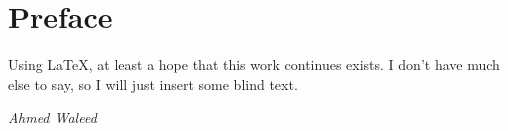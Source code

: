 \chapter*{Preface}

Using \LaTeX\xspace , at least a hope that this work continues exists.
I don't have much else to say, so I will just insert some blind text. 
\blindtext

\begin{flushright}
	\textit{Ahmed Waleed}
\end{flushright}
